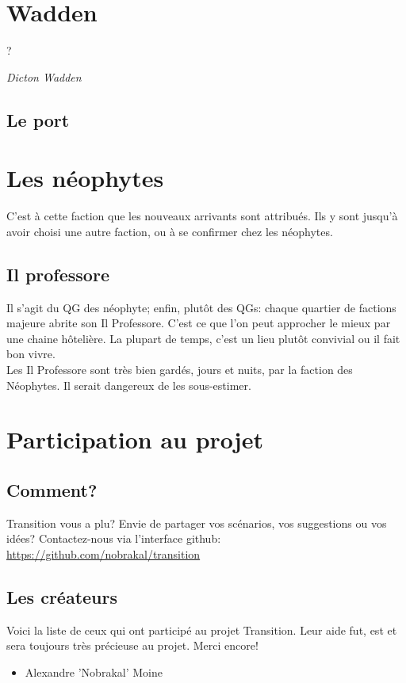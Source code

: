 \documentclass{book}
\begin{document}
\section{Wadden}
\epigraph{?}{\textit{Dicton Wadden}}

\subsection{Le port}

\hypertarget{neophytes}{\section{Les néophytes}}
C'est à cette faction que les nouveaux arrivants sont attribués. Ils y sont jusqu'à avoir choisi une autre faction, ou à se confirmer chez les néophytes.

\subsection{Il professore}
Il s'agit du QG des néophyte; enfin, plutôt des QGs: chaque quartier de factions majeure abrite son Il Professore. C'est ce que l'on peut approcher le mieux par une chaine hôtelière. La plupart de temps, c'est un lieu plutôt convivial ou il fait bon vivre. 
\\
Les Il Professore sont très bien gardés, jours et nuits, par la faction des Néophytes. Il serait dangereux de les sous-estimer.

\newpage
\section{Participation au projet}
\subsection{Comment?}
\hypertarget{participation}{}
Transition vous a plu? 
Envie de partager vos scénarios, vos suggestions ou vos idées?
\newline
Contactez-nous via l'interface github: \href {https://github.com/nobrakal/transition} {https://github.com/nobrakal/transition}
\subsection{Les créateurs}
Voici la liste de ceux qui ont participé au projet Transition. Leur aide fut, est et sera toujours très précieuse au projet. Merci encore!  
\begin{itemize}
\item Alexandre ’Nobrakal’ Moine 
\end{itemize}
\end{document}
